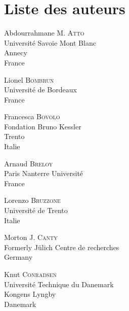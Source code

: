 \documentclass[main.tex]{subfiles}
\begin{document}
\chapter*{Liste des auteurs}

\begin{multicols}{2}

\begin{flushleft}
Abdourrahmane M. \textsc{Atto}\\Universit\'e Savoie Mont Blanc\\Annecy\\France\\[-12pt]
\end{flushleft}

\begin{flushleft}
Lionel \textsc{Bombrun}\\Universit\'e de Bordeaux\\France\\[-12pt]
\end{flushleft}

\begin{flushleft}
Francesca \textsc{Bovolo}\\Fondation Bruno Kessler\\Trento\\Italie\\[-12pt]
\end{flushleft}

\begin{flushleft}
Arnaud \textsc{Breloy}\\Paris Nanterre Universit\'e\\France\\[-12pt]
\end{flushleft}

\begin{flushleft}
Lorenzo \textsc{Bruzzone}\\Universit\'e de Trento\\Italie\\[-12pt]
\end{flushleft}

\begin{flushleft}
Morton \textsc{J. Canty}\\Formerly J\"{u}lich Centre de recherches\\Germany\\[-12pt]
\end{flushleft}

\begin{flushleft}
Knut \textsc{Conradsen}\\Universit\'e Technique du Danemark\\Kongens Lyngby\\Danemark
\end{flushleft}\columnbreak


\end{multicols}
\end{document}
